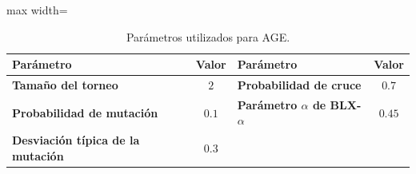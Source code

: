 \begin{table}[H]
    \centering
    \begin{adjustbox}{max width=\textwidth}
        \begin{tabular}{lc|lc}
            \toprule
            \textbf{Parámetro}                              & \textbf{Valor} &
            \textbf{Parámetro}                              & \textbf{Valor}   \\
            \midrule
            \textbf{Tamaño del torneo}                      & \(2\)          &
            \textbf{Probabilidad de cruce}                  & \(0.7\)          \\
            \textbf{Probabilidad de mutación}               & \(0.1\)        &
            \textbf{Parámetro \(\alpha\) de BLX-\(\alpha\)} & \(0.45\)         \\
            \textbf{Desviación típica de la mutación}       & \(0.3\)        &
                                                            &                  \\
            \bottomrule
        \end{tabular}
    \end{adjustbox}
    \caption{Parámetros utilizados para AGE.}
    \label{tab:parametros_age}
\end{table}